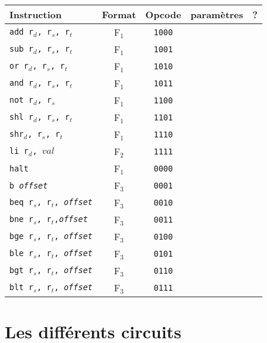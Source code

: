 \documentclass[a4paper]{article}
\begin{document}
			\begin{tabular}{|p{4cm}|c|c|c|c|}
			\hline Instruction & Format & Opcode & paramètres & ? \\ 
			\hline \texttt{add r$_{d}$, r$_{s}$, r$_{t}$} & F$_{1}$ & \texttt{1000} &  &  \\ 
			\hline \texttt{sub r$_{d}$, r$_{s}$, r$_{t}$} & F$_{1}$ & \texttt{1001} &  &  \\ 
			\hline \texttt{or r$_{d}$, r$_{s}$, r$_{t}$} & F$_{1}$ & \texttt{1010} &  &  \\ 
			\hline \texttt{and r$_{d}$, r$_{s}$, r$_{t}$} & F$_{1}$ & \texttt{1011} &  &  \\ 
			\hline \texttt{not r$_{d}$, r$_{s}$} & F$_{1}$ & \texttt{1100} &  &  \\ 
			\hline \texttt{shl r$_{d}$, r$_{s}$, r$_{t}$} & F$_{1}$ & \texttt{1101} &  &  \\ 
			\hline \texttt{shr$_{d}$, r$_{s}$, r$_{t}$} & F$_{1}$ & \texttt{1110} &  &  \\ 
			\hline \texttt{li r$_{d}$, $val$} & F$_{2}$ & \texttt{1111} &  &  \\ 
			\hline \texttt{halt} & F$_{1}$ & \texttt{0000} &  &  \\ 
			\hline \texttt{b \textit{offset}} & F$_{3}$ & \texttt{0001} &  &  \\
			\hline \texttt{beq r$_{s}$, r$_{t}$, \textit{offset}} & F$_{3}$ & \texttt{0010} &  &  \\ 
			\hline \texttt{bne r$_{s}$, r$_{t}$,\textit{offset}} & F$_{3}$ & \texttt{0011} &  &  \\ 
			\hline \texttt{bge r$_{s}$, r$_{t}$, \textit{offset}} & F$_{3}$ & \texttt{0100} &  &  \\ 
			\hline \texttt{ble r$_{s}$, r$_{t}$, \textit{offset}} & F$_{3}$ & \texttt{0101} &  &  \\ 
			\hline \texttt{bgt r$_{s}$, r$_{t}$, \textit{offset}} & F$_{3}$ & \texttt{0110} &  &  \\ 
			\hline \texttt{blt r$_{s}$, r$_{t}$, \textit{offset}} & F$_{3}$ & \texttt{0111} &  &  \\ 

			\hline 
			\end{tabular}
			
			\paragraph{}{}
		
	\section{Les différents circuits}
\end{document}

